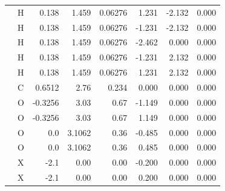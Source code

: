 \begin{table}[H]
\begin{centering}
\begin{tabular*}{1\linewidth}{@{\extracolsep{\fill}}llrrrrrr}
 & {\scriptsize{}H} & {\scriptsize{}0.138 } & {\scriptsize{}1.459} & {\scriptsize{}0.06276 } & {\scriptsize{}1.231} & {\scriptsize{}-2.132} & {\scriptsize{}0.000}\tabularnewline
\addlinespace[-0.17em]
\addlinespace[-0.33em]
 & {\scriptsize{}H} & {\scriptsize{}0.138 } & {\scriptsize{}1.459} & {\scriptsize{}0.06276 } & {\scriptsize{}-1.231} & {\scriptsize{}-2.132} & {\scriptsize{}0.000}\tabularnewline
\addlinespace[-0.17em]
\addlinespace[-0.33em]
 & {\scriptsize{}H} & {\scriptsize{}0.138 } & {\scriptsize{}1.459} & {\scriptsize{}0.06276 } & {\scriptsize{}-2.462} & {\scriptsize{}0.000} & {\scriptsize{}0.000}\tabularnewline
\addlinespace[-0.17em]
\addlinespace[-0.33em]
 & {\scriptsize{}H} & {\scriptsize{}0.138 } & {\scriptsize{}1.459} & {\scriptsize{}0.06276 } & {\scriptsize{}-1.231} & {\scriptsize{}2.132} & {\scriptsize{}0.000}\tabularnewline
\addlinespace[-0.17em]
\addlinespace[-0.33em]
 & {\scriptsize{}H} & {\scriptsize{}0.138 } & {\scriptsize{}1.459} & {\scriptsize{}0.06276 } & {\scriptsize{}1.231} & {\scriptsize{}2.132} & {\scriptsize{}0.000}\tabularnewline
\addlinespace[-0.17em]
\midrule 
\addlinespace[-0.33em]
{\scriptsize{}$\mathrm{CO_{2}}$ \citep{Harris_1995}} & {\scriptsize{}C} & {\scriptsize{}0.6512 } & {\scriptsize{}2.76} & {\scriptsize{}0.234} & {\scriptsize{}0.000 } & {\scriptsize{}0.000 } & {\scriptsize{}0.000 }\tabularnewline
\addlinespace[-0.17em]
\addlinespace[-0.33em]
 & {\scriptsize{}O} & {\scriptsize{}-0.3256} & {\scriptsize{}3.03 } & {\scriptsize{}0.67} & {\scriptsize{}-1.149 } & {\scriptsize{}0.000 } & {\scriptsize{}0.000 }\tabularnewline
\addlinespace[-0.17em]
\addlinespace[-0.33em]
 & {\scriptsize{}O} & {\scriptsize{}-0.3256} & {\scriptsize{}3.03 } & {\scriptsize{}0.67} & {\scriptsize{}1.149 } & {\scriptsize{}0.000 } & {\scriptsize{}0.000 }\tabularnewline
\addlinespace[-0.17em]
\midrule 
\addlinespace[-0.33em]
{\scriptsize{}$\mathrm{O_{2}}$ \citep{Boutard200525}} & {\scriptsize{}O} & {\scriptsize{}0.0} & {\scriptsize{}3.1062} & {\scriptsize{}0.36 } & {\scriptsize{}-0.485} & {\scriptsize{}0.000 } & {\scriptsize{}0.000 }\tabularnewline
\addlinespace[-0.17em]
\addlinespace[-0.33em]
 & {\scriptsize{}O} & {\scriptsize{}0.0} & {\scriptsize{}3.1062} & {\scriptsize{}0.36 } & {\scriptsize{}0.485} & {\scriptsize{}0.000 } & {\scriptsize{}0.000 }\tabularnewline
\addlinespace[-0.17em]
\addlinespace[-0.33em]
 & {\scriptsize{}X} & {\scriptsize{}-2.1} & {\scriptsize{}0.00} & {\scriptsize{}0.00} & {\scriptsize{}-0.200} & {\scriptsize{}0.000 } & {\scriptsize{}0.000 }\tabularnewline
\addlinespace[-0.17em]
\addlinespace[-0.33em]
 & {\scriptsize{}X} & {\scriptsize{}-2.1} & {\scriptsize{}0.00} & {\scriptsize{}0.00} & {\scriptsize{}0.200} & {\scriptsize{}0.000 } & {\scriptsize{}0.000 }\tabularnewline

\end{tabular*}
\end{centering}
\end{table}

